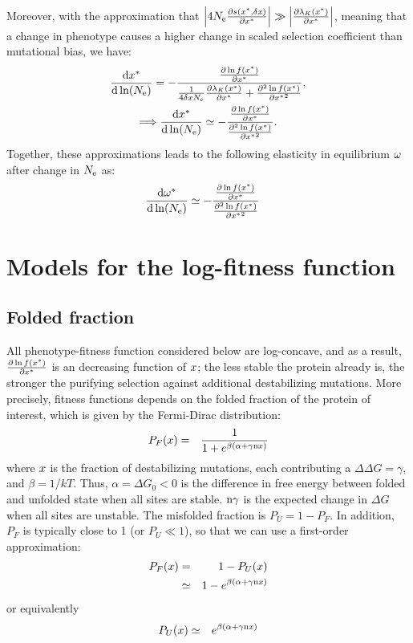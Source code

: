 \documentclass{article}
\begin{document}
Moreover, with the approximation that $\left| 4 N_{\mathrm{e}} \frac{ \partial s(x^{*}, \delta x) }{\partial x^{*} } \right| \gg \left| \frac{\partial \lambda_K (x^{*}) }{\partial x^{*} } \right|$, meaning that a change in phenotype causes a higher change in scaled selection coefficient than mutational bias, we have:
\begin{gather}
\frac{ \mathrm{d} x^{*}}{\mathrm{d} \ln (N_{\mathrm{e}})}  = - \frac{\frac{ \partial \ln f(x^{*}) }{\partial {x^{*}}}}{\frac{1}{4 \delta x N_{\mathrm{e}}} \frac{\partial \lambda_K (x^{*}) }{\partial x^{*} } + \frac{ \partial^2 \ln f(x^{*}) }{\partial {x^{*}}^2}},\\
\Longrightarrow \frac{ \mathrm{d} x^{*}}{\mathrm{d} \ln (N_{\mathrm{e}})}  \simeq - \frac{\frac{ \partial \ln f(x^{*}) }{\partial {x^{*}}}}{\frac{ \partial^2 \ln f(x^{*}) }{\partial {x^{*}}^2}}. \label{eq:approx_dx_dlnNe}
\end{gather}
Together, these approximations leads to the following elasticity in equilibrium $\omega$ after change in $N_{\mathrm{e}}$ as:
\begin{align}
\frac{ \mathrm{d} \omega^{*}}{\mathrm{d} \ln (N_{\mathrm{e}})} & \simeq - \frac{\frac{ \partial \ln f(x^{*}) }{\partial {x^{*}}}}{\frac{ \partial^2 \ln f(x^{*}) }{\partial {x^{*}}^2}}\label{eq:approx_dw_dlnNe}
\end{align}

\section{Models for the log-fitness function}

\subsection{Folded fraction}
All phenotype-fitness function considered below are log-concave, and as a result, $\frac{ \partial \ln f(x^{*}) }{\partial {x^{*}}}$ is an decreasing function of $x$; the less stable the protein already is, the stronger the purifying selection against additional destabilizing mutations. More precisely, fitness functions depends on the folded fraction of the protein of interest, which is given by the Fermi-Dirac distribution:
\begin{eqnarray}
P_{F} (x) &=& \frac{1}{1 + e^{\beta(\alpha + \gamma \text{n} x)}}
\end{eqnarray}
where $x$ is the fraction of destabilizing mutations, each contributing a $\Delta \Delta G = \gamma$, and $\beta = 1 / kT$. Thus, $\alpha = \Delta G_0 < 0$ is the difference in free energy between folded and unfolded state when all sites are stable. $\text{n} \gamma$ is the expected change in $\Delta G$ when all sites are unstable. The misfolded fraction is  $P_{U} = 1-P_{F}$. In addition, $P_{F}$ is typically close to 1 (or $P_{U} \ll 1$), so that we can use a first-order approximation:
\begin{eqnarray}
P_{F}(x) &=& 1 - P_{U}(x) \\
&\simeq& 1 - e^{\beta(\alpha + \gamma \text{n} x)}
\end{eqnarray}
or equivalently
\begin{eqnarray}
P_{U}(x) &\simeq& e^{\beta(\alpha + \gamma \text{n} x)}
\end{eqnarray}
\end{document}
